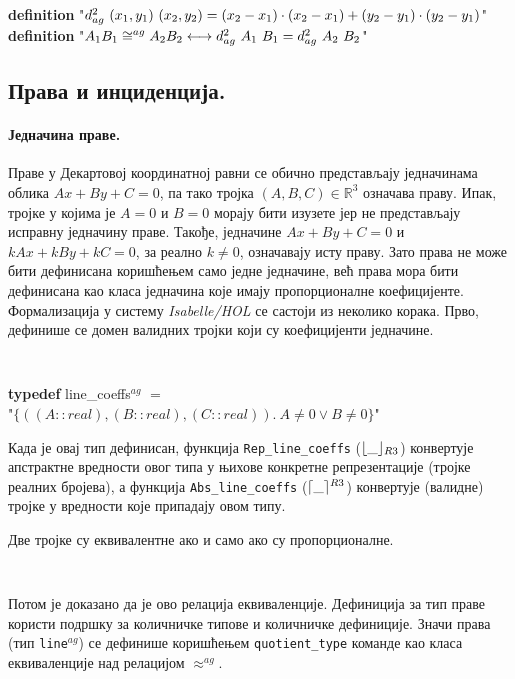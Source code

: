 {\tt
\begin{tabbing}
\textbf{definition} "$d^2_{ag}\ (x_1, y_1)\ (x_2, y_2) = (x_2-x_1)\cdot (x_2-x_1)+(y_2-y_1)\cdot (y_2-y_1)$"\\
\textbf{definition} "$A_1B_1 \cong^{ag} A_2B_2 \longleftrightarrow d^2_{ag}\ A_1\ B_1 = d^2_{ag}\ A_2\ B_2$"
\end{tabbing}
}

\subsection{Права и инциденција.}

\paragraph{Једначина праве.}
Праве у Декартовој координатној равни се обично пре\-дста\-вља\-ју
једначинама облика $Ax + By + C = 0$, па тако тројка $(A, B, C) \in
\mathbb{R}^3$ означава праву. Ипак, тројке у којима је $A = 0$ и $B =
0$ морају бити изузете јер не представљају исправну једначину
праве. Такође, једначине $Ax + By + C = 0$ и $kAx + kBy + kC = 0$, за
реално $k \neq 0$, означавају исту праву. Зато права не може бити
дефинисана коришћењем само једне једначине, већ права мора бити
дефинисана као класа једначина које имају пропорционалне
коефицијенте. Формализација у систему \emph{Isabelle/HOL} се састоји
из неколико корака. Прво, дефинише се домен валидних тројки који су
коефицијенти једначине.  
 {\tt
\begin{tabbing}
\textbf{typedef} line\_coeffs$^{ag}$ $=$ \\
\hspace{5mm}"$\{((A::real), (B::real), (C::real)).\ A \neq 0 \vee B \neq 0\}$"
\end{tabbing}
}
\noindent Када је овај тип дефинисан, функција
{\tt Rep\_line\_coeffs} ($\lfloor\_\rfloor_{R3}$) конвертује апстрактне вредности овог типа
у њихове конкретне репрезентације (тројке реалних бројева), а функција
{\tt Abs\_line\_coeffs} ($\lceil\_\rceil^{R3}$) конвертује (валидне) тројке у вредности
које припадају овом типу.

Две тројке су еквивалентне ако и само ако су пропорционалне.
{\tt
\begin{tabbing}
\hspace{5mm}\=\kill
\textbf{definition} "$l_1 \approx^{ag} l_2$ $\longleftrightarrow$} \\
\>  $(\exists\ A_1\,B_1\,C_1\,A_2\,B_2\,C_2.$\\
\>  $\RepRt{l_1} = (A_1, B_1, C_1)) \ \wedge\ \RepRt{l_2} = (A_2, B_2, C_2)\ \wedge$\\
\>  $(\exists k.\ k \neq 0 \,\wedge\, A_2 = k\cdot A_1 \,\wedge\,  B_2 = k\cdot B_1\,\wedge\,C_2 = k\cdot C_1))$"}
\end{tabbing}
}
\noindent Потом је доказано да је ово релација
еквиваленције. Дефиниција за тип праве користи подршку за количничке
типове и количничке дефиниције. Значи права (тип {\tt line$^{ag}$})
се дефинише коришћењем {\tt quotient\_type} команде као класа
еквиваленције над релацијом $\approx^{ag}$.

